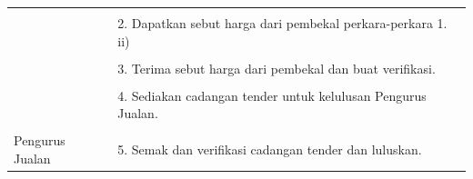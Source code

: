 \documentclass[
]{article}
\begin{document}
\begin{longtable}[]{@{}ll@{}}
\begin{minipage}[t]{0.27\columnwidth}
\strut
\end{minipage} & \begin{minipage}[t]{0.67\columnwidth}\raggedright
\strut
\end{minipage}\tabularnewline
\begin{minipage}[t]{0.27\columnwidth}\raggedright
\strut
\end{minipage} & \begin{minipage}[t]{0.67\columnwidth}\raggedright
2. Dapatkan sebut harga dari pembekal perkara-perkara 1. ii)\strut
\end{minipage}\tabularnewline
\begin{minipage}[t]{0.27\columnwidth}\raggedright
\strut
\end{minipage} & \begin{minipage}[t]{0.67\columnwidth}\raggedright
\strut
\end{minipage}\tabularnewline
\begin{minipage}[t]{0.27\columnwidth}\raggedright
\strut
\end{minipage} & \begin{minipage}[t]{0.67\columnwidth}\raggedright
3. Terima sebut harga dari pembekal dan buat verifikasi.\strut
\end{minipage}\tabularnewline
\begin{minipage}[t]{0.27\columnwidth}\raggedright
\strut
\end{minipage} & \begin{minipage}[t]{0.67\columnwidth}\raggedright
\strut
\end{minipage}\tabularnewline
\begin{minipage}[t]{0.27\columnwidth}\raggedright
\strut
\end{minipage} & \begin{minipage}[t]{0.67\columnwidth}\raggedright
4. Sediakan cadangan tender untuk kelulusan Pengurus Jualan.\strut
\end{minipage}\tabularnewline
\begin{minipage}[t]{0.27\columnwidth}\raggedright
\strut
\end{minipage} & \begin{minipage}[t]{0.67\columnwidth}\raggedright
\strut
\end{minipage}\tabularnewline
\begin{minipage}[t]{0.27\columnwidth}\raggedright
Pengurus Jualan\strut
\end{minipage} & \begin{minipage}[t]{0.67\columnwidth}\raggedright
5. Semak dan verifikasi cadangan tender dan luluskan.\strut

\end{minipage}
\end{longtable}
\end{document}
